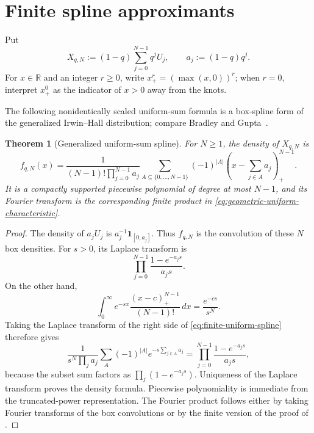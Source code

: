 \documentclass[11pt,oneside,openany]{book}
\newtheorem{theorem}{Theorem}[chapter]
\theoremstyle{definition}
\theoremstyle{remark}
\newcommand{\R}{\mathbb R}
\newcommand{\one}{\mathbf 1}
\newcommand{\abs}[1]{\lvert #1\rvert}
\begin{document}
\section{Finite spline approximants}

Put
\begin{equation}\label{eq:finite-geometric-uniform-sum}
 X_{q,N}:=(1-q)\sum_{j=0}^{N-1}q^jU_j,
 \qquad
 a_j:=(1-q)q^j.
\end{equation}
For $x\in\R$ and an integer $r\ge0$, write
$x_+^r=(\max(x,0))^r$; when $r=0$, interpret $x_+^0$ as the indicator of $x>0$ away from the knots.

The following nonidentically scaled uniform-sum formula is a box-spline form of the generalized Irwin--Hall distribution; compare Bradley and Gupta~\cite{BradleyGupta2004}.

\begin{theorem}[Generalized uniform-sum spline]\label{thm:finite-uniform-spline}
For $N\ge1$, the density of $X_{q,N}$ is
\begin{equation}\label{eq:finite-uniform-spline}
 f_{q,N}(x)
 =\frac1{(N-1)!\prod_{j=0}^{N-1}a_j}
 \sum_{A\subseteq\{0,\ldots,N-1\}}
 (-1)^{\abs A}
 \left(x-\sum_{j\in A}a_j\right)_+^{N-1}.
\end{equation}
It is a compactly supported piecewise polynomial of degree at most $N-1$, and its Fourier transform is the corresponding finite product in
\eqref{eq:geometric-uniform-characteristic}.
\end{theorem}

\begin{proof}
The density of $a_jU_j$ is $a_j^{-1}\one_{[0,a_j]}$.  Thus $f_{q,N}$ is the convolution of these $N$ box densities.  For $s>0$, its Laplace transform is
\[
 \prod_{j=0}^{N-1}\frac{1-e^{-a_js}}{a_js}.
\]
On the other hand,
\[
 \int_0^\infty e^{-sx}\frac{(x-c)_+^{N-1}}{(N-1)!}\,dx
 =\frac{e^{-cs}}{s^N}.
\]
Taking the Laplace transform of the right side of
\eqref{eq:finite-uniform-spline} therefore gives
\[
 \frac1{s^N\prod_j a_j}
 \sum_A(-1)^{\abs A}e^{-s\sum_{j\in A}a_j}
 =\prod_{j=0}^{N-1}\frac{1-e^{-a_js}}{a_js},
\]
because the subset sum factors as $\prod_j(1-e^{-a_js})$.  Uniqueness of the Laplace transform proves the density formula.  Piecewise polynomiality is immediate from the truncated-power representation.  The Fourier product follows either by taking Fourier transforms of the box convolutions or by the finite version of the proof of .
\end{proof}
\end{document}
